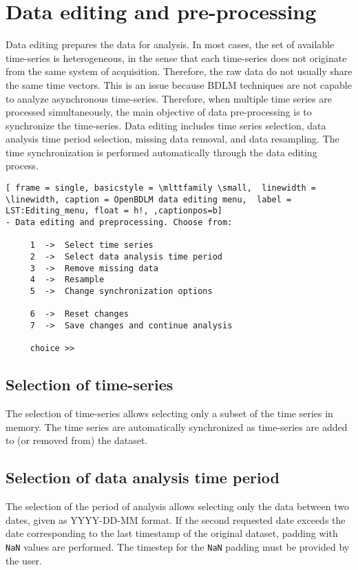 \section{Data editing and pre-processing}
\label{S:DATAEDITINGPREPROCESSING}

Data editing prepares the data for analysis.
In most cases, the set of available time-series is heterogeneous, in the sense that each time-series does not originate from the same system of acquisition.
Therefore, the raw data do not usually share the same time vectors.
This is an issue because BDLM techniques are not capable to analyze asynchronous time-series.
Therefore, when multiple time series are processed simultaneously, the main objective of data pre-processing is to synchronize the time-series. 
Data editing includes time series selection, data analysis time period selection, missing data removal, and data  resampling.
The time synchronization is performed automatically through the data editing process.

\begin{lstlisting}[ frame = single, basicstyle = \mlttfamily \small,  linewidth = \linewidth, caption = OpenBDLM data editing menu,  label = LST:Editing_menu, float = h!, ,captionpos=b]
- Data editing and preprocessing. Choose from:

     1  ->  Select time series
     2  ->  Select data analysis time period 
     3  ->  Remove missing data
     4  ->  Resample
     5  ->  Change synchronization options

     6  ->  Reset changes
     7  ->  Save changes and continue analysis

     choice >> 
\end{lstlisting}    

\subsection{Selection of time-series}
\label{SS:SelectionTimeSeries}

The selection of time-series allows selecting only a subset of the time series in memory.
The time series are automatically synchronized as time-series are added to (or removed from) the dataset.

\subsection{Selection of data analysis time period}
\label{SS:SelectionPeriodAnalysis}

The selection of the period of analysis allows selecting only the data between two dates, given as \textquotesingle YYYY-DD-MM\textquotesingle {} format.
If the second requested date exceeds the date corresponding to the last timestamp of the original dataset, padding with \lstinline[basicstyle = \mlttfamily \small ]!NaN! values are performed. 
The timestep for the \lstinline[basicstyle = \mlttfamily \small ]!NaN! padding must be provided by the user.

